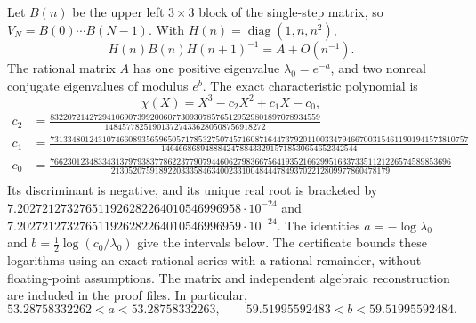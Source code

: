\documentclass[11pt]{article}
\begin{document}
Let $B(n)$ be the upper left $3\times3$ block of the single-step matrix,
so $V_N=B(0)\cdots B(N-1)$. With $H(n)=\operatorname{diag}(1,n,n^2)$,
\[
 H(n)B(n)H(n+1)^{-1}=A+O(n^{-1}).
\]
The rational matrix $A$ has one positive eigenvalue $\lambda_0=e^{-a}$,
and two nonreal conjugate eigenvalues of modulus $e^b$.
The exact characteristic polynomial is
\[
 \chi(X)=X^3-c_2X^2+c_1X-c_0,
\]
{\small
\begin{align*}
 c_2&=\frac{83220721427294106907399200607730930785765129529801897078934559}{1484577825190137274336280508756918272}\\
 c_1&=\frac{731334801243107466089356596505717853275074571608716447379201100334794667003154611901941573810757}{146466868948884247884332915718530654652342544}\\
 c_0&=\frac{76623012348334313797938377862237790794460627983667564193521662995163373351121226574589853696}{2130520759189220333584634002331004844478493702212809977860478179}\\
\end{align*}
}
Its discriminant is negative, and its unique real root is bracketed by
$7.202721273276511926282264010546996958\cdot10^{-24}$ and
$7.202721273276511926282264010546996959\cdot10^{-24}$.
The identities $a=-\log\lambda_0$ and $b=\tfrac12\log(c_0/\lambda_0)$
give the intervals below. The certificate bounds these logarithms using an
exact rational series with a rational remainder, without floating-point assumptions.
The matrix and independent algebraic reconstruction are included in the proof files. In particular,
\[
 53.28758332262<a<53.28758332263,\qquad
 59.51995592483<b<59.51995592484.
\]
\end{document}
